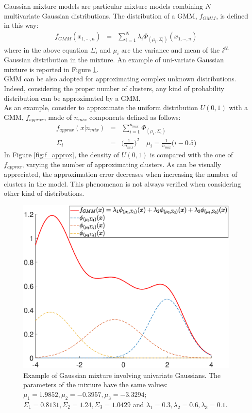 \documentclass{article}
\begin{document}
Gaussian mixture models are particular mixture models combining $N$ multivariate Gaussian distributions.
The distribution of a GMM, $f_{GMM}$, is defined in this way:
\begin{eqnarray}
f_{GMM}(x_{1,\cdots,n}) &=& \sum_{i=1}^{N} \lambda_i \Phi_{(\mu_i, \Sigma_i)}(x_{1,\cdots,n}) 
\end{eqnarray}
where in the above equation $\Sigma_i$ and $\mu_i$ are the variance and mean of the $i^{th}$ Gaussian distribution in the mixture. 
An example of uni-variate Gaussian mixture is reported in Figure \ref{fig:GMM_uni}.
\\
GMM can be also adopted for approximating complex unknown distributions.  Indeed, considering the proper number of clusters, any kind of probability distribution can be approximated by a GMM. 
\\
As an example, consider to approximate the uniform distribution $U(0,1)$ with a GMM, $f_{approx}$, made of $n_{mix}$ components defined as follows:
\begin{eqnarray}
f_{approx}(x | n_{mix}) &=& \sum _{i=1}^{n_{mix}}  \Phi_{(\mu_i, \Sigma_i)} \nonumber\\
\Sigma_i &=& \bigg( {\frac{1}{n_{mix}}} \bigg)^{2} \,\,\,\,\,\, 
\mu_i = \frac{1}{n_{mix}} \bigg( i - 0.5 \bigg)
\label{eq:GMM_pdf}
\end{eqnarray}
In Figure \ref{fig:f_approx}, the density of $U(0,1)$ is compared with the one of $f_{approx}$, varying the number of approximating clusters. As can be visually appreciated, the approximation error decreases when increasing the number of clusters in the model. This phenomenon is not always verified when considering other kind of distributions.

\begin{figure}
	\centering
	\includegraphics[width=0.6 \columnwidth]{./image/normal_03.eps}
	\caption{Example of Gaussian mixture involving univariate Gaussians. The parameters of the mixture have the same values: $\mu_1 =  1.9852, \mu_2 = -0.3957, \mu_3= -3.3294$; $\Sigma_1 =  0.8131, \Sigma_2 = 1.24, \Sigma_3= 1.0429$ and $\lambda_1 = 0.3, \lambda_2 = 0.6, \lambda_3 = 0.1$.}
	\label{fig:GMM_uni}
\end{figure} 
\end{document}
